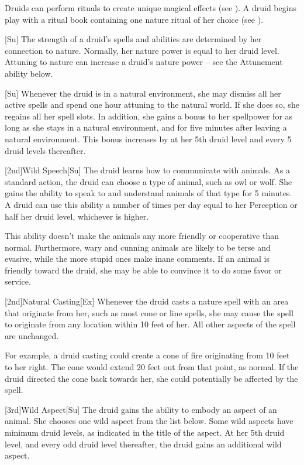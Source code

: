 Druids can perform rituals to create unique magical effects (see ).
A druid begins play with a ritual book containing one nature ritual of her choice (see ).

[Su]
The strength of a druid's spells and abilities are determined by her connection to nature.
Normally, her nature power is equal to her druid level.
Attuning to nature can increase a druid's nature power -- see the Attunement ability below.

[Su]
Whenever the druid is in a natural environment, she may dismiss all her active spells and spend one hour attuning to the natural world.
If she does so, she regains all her spell slots.
In addition, she gains a  bonus to her spellpower for as long as she stays in a natural environment, and for five minutes after leaving a natural environment. This bonus increases by  at her 5th druid level and every 5 druid levels thereafter.

[2nd]{Wild Speech}[Su]
The druid learns how to communicate with animals.
As a standard action, the druid can choose a type of animal, such as owl or wolf.
She gains the ability to speak to and understand animals of that type for 5 minutes.
A druid can use this ability a number of times per day equal to her Perception or half her druid level, whichever is higher.

This ability doesn't make the animals any more friendly or cooperative than normal.
Furthermore, wary and cunning animals are likely to be terse and evasive, while the more stupid ones make inane comments.
If an animal is friendly toward the druid, she may be able to convince it to do some favor or service.

[2nd]{Natural Casting}[Ex]
Whenever the druid casts a nature spell with an area that originate from her, such as most cone or line spells, she may cause the spell to originate from any location within 10 feet of her.
All other aspects of the spell are unchanged.

For example, a druid casting  could create a cone of fire originating from 10 feet to her right.
The cone would extend 20 feet out from that point, as normal.
If the druid directed the cone back towards her, she could potentially be affected by the spell.

[3rd]{Wild Aspect}[Su]
The druid gains the ability to embody an aspect of an animal.
She chooses one wild aspect from the list below.
Some wild aspects have minimum druid levels, as indicated in the title of the aspect.
At her 5th druid level, and every odd druid level thereafter, the druid gains an additional wild aspect.

